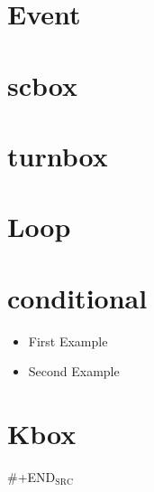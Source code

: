 \documentclass{oblivoir}
\author{frege holy}
\date{\today}
\title{}
\begin{document}
\tableofcontents

\section{Event}
\label{sec:orgd891134}
\begin{Scratch}
\end{Scratch}

\section{scbox}
\label{sec:org67a593e}
\begin{Scratch}
\end{Scratch}

\section{turnbox}
\label{sec:orgb5ad47c}
\begin{Scratch}
\end{Scratch}

\section{Loop}
\label{sec:org3464b6d}
\begin{Scratch}


\end{Scratch}

\section{conditional}
\label{sec:org7d65369}
\begin{itemize}
\item First Example
\end{itemize}
\begin{Scratch}
\end{Scratch}

\begin{itemize}
\item Second Example
\end{itemize}
\begin{Scratch}
\end{Scratch}

\section{Kbox}
\label{sec:org5e2043b}
\begin{Scratch}
\end{Scratch}

\#+END\(_{\text{SRC}}\)
\end{document}
